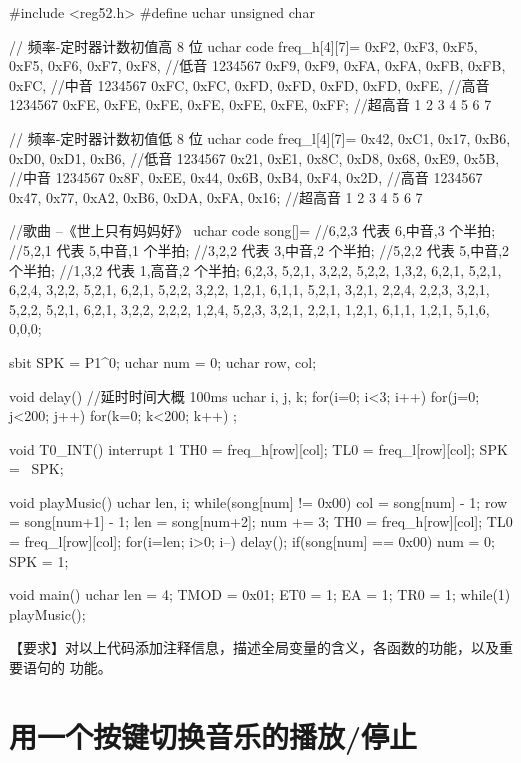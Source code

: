 \documentclass{swfulabreport}
\begin{document}
\begin{ccode}
#include <reg52.h>
#define uchar unsigned char

// 频率-定时器计数初值高 8 位
uchar code freq_h[4][7]={
   {0xF2, 0xF3, 0xF5, 0xF5, 0xF6, 0xF7, 0xF8},  //低音 1234567
   {0xF9, 0xF9, 0xFA, 0xFA, 0xFB, 0xFB, 0xFC},  //中音 1234567
   {0xFC, 0xFC, 0xFD, 0xFD, 0xFD, 0xFD, 0xFE},  //高音 1234567
   {0xFE, 0xFE, 0xFE, 0xFE, 0xFE, 0xFE, 0xFF}}; //超高音 1 2 3 4 5 6 7

// 频率-定时器计数初值低 8 位
uchar code freq_l[4][7]={
   {0x42, 0xC1, 0x17, 0xB6, 0xD0, 0xD1, 0xB6},  //低音 1234567
   {0x21, 0xE1, 0x8C, 0xD8, 0x68, 0xE9, 0x5B},  //中音 1234567
   {0x8F, 0xEE, 0x44, 0x6B, 0xB4, 0xF4, 0x2D},  //高音 1234567
   {0x47, 0x77, 0xA2, 0xB6, 0xDA, 0xFA, 0x16}}; //超高音 1 2 3 4 5 6 7

//歌曲 --《世上只有妈妈好》
uchar code song[]={
  //6,2,3 代表 6,中音,3 个半拍;
  //5,2,1 代表 5,中音,1 个半拍;
  //3,2,2 代表 3,中音,2 个半拍;
  //5,2,2 代表 5,中音,2 个半拍;
  //1,3,2 代表 1,高音,2 个半拍;
  6,2,3, 5,2,1, 3,2,2, 5,2,2, 1,3,2, 6,2,1, 5,2,1, 6,2,4,
  3,2,2, 5,2,1, 6,2,1, 5,2,2, 3,2,2, 1,2,1, 6,1,1, 5,2,1, 3,2,1, 2,2,4,
  2,2,3, 3,2,1, 5,2,2, 5,2,1, 6,2,1, 3,2,2, 2,2,2, 1,2,4,
  5,2,3, 3,2,1, 2,2,1, 1,2,1, 6,1,1, 1,2,1, 5,1,6, 0,0,0};

sbit SPK = P1^0;
uchar num = 0;
uchar row, col;

void delay()    //延时时间大概 100ms
{
  uchar i, j, k;
  for(i=0; i<3; i++)
  {
     for(j=0; j<200; j++)
     {
        for(k=0; k<200; k++)
        {
           ;
        }
     }
  }
}

void T0_INT() interrupt 1
{
  TH0 = freq_h[row][col];
  TL0 = freq_l[row][col];
  SPK = ~SPK;
}

void playMusic()
{
  uchar len, i;
  while(song[num] != 0x00)
  {
     col = song[num] - 1;
     row = song[num+1] - 1;
     len = song[num+2];
     num += 3;
     TH0 = freq_h[row][col];
     TL0 = freq_l[row][col];
     for(i=len; i>0; i--)
     {
        delay();
     }
  }
  if(song[num] == 0x00)
  {
     num = 0;
  }
  SPK = 1;
}

void main()
{
  uchar len = 4;
  TMOD = 0x01;
  ET0 = 1;
  EA = 1;
  TR0 = 1;
  while(1)
  {
     playMusic();
  }
}
\end{ccode}

【要求】对以上代码添加注释信息，描述全局变量的含义，各函数的功能，以及重要语句的
功能。

\section{用一个按键切换音乐的播放/停止}
\end{document}
